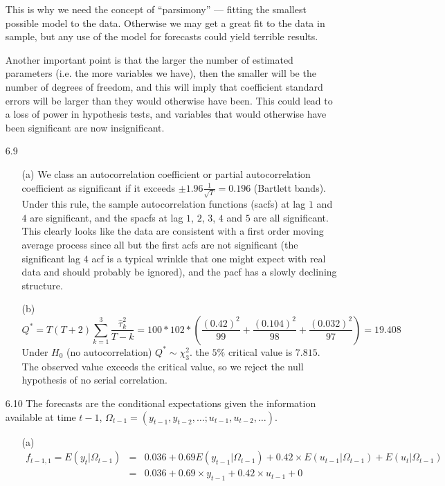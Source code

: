 \documentclass[11pt,a4paper]{article}
\begin{document}
\begin{itemize}
This is why we need
the concept of ``parsimony'' --- fitting the smallest possible model to the data.
Otherwise we may get a great fit to the data in sample, but any use of the
model for forecasts could yield terrible results.

Another important point is
that the larger the number of estimated parameters (i.e. the more variables we
have), then the smaller will be the number of degrees of freedom, and this will
imply that coefficient standard errors will be larger than they would otherwise
 have been. This could lead to a loss of power in hypothesis tests, and
variables that would otherwise have been significant are now insignificant.
\item[6.9]
\begin{itemize}
\item[(a)] We class an autocorrelation coefficient or partial autocorrelation
coefficient as  significant if it exceeds $\pm 1.96 \frac{1}{\sqrt{T}}=0.196$ (Bartlett bands). Under this rule, the sample autocorrelation functions (sacfs) at lag
 $1$ and $4$ are
significant, and the spacfs at lag $1$, $2$, $3$, $4$ and $5$ are all significant. This
clearly looks like the data are consistent with a first order moving average
process since all but the first acfs are not significant (the significant lag
$4$ acf is a typical wrinkle that one might expect with real data and should
probably be ignored), and the pacf has a slowly declining structure.
\item[(b)]
$$
 Q^* = T(T+2) \sum_{k=1}^3 \frac{\hat \tau^2_k}{T-k} = 100*102*\left(
\frac{(0.42)^2}{99}+\frac{(0.104)^2}{98}+\frac{(0.032)^2}{97}
\right) = 19.408
$$
Under $H_0$ (no autocorrelation) $Q^* \sim \chi^2_3$. the $5\%$ critical
value is $7.815$. The observed value exceeds the critical
value, so we reject the null hypothesis of no serial correlation.
\end{itemize}
\item[6.10]
The forecasts are the conditional expectations given the information
available at time $t-1$, $\Omega_{t-1} = (y_{t-1}, y_{t-2}, \ldots ; u_{t-1}, u_{t-2}, \ldots)$.
\begin{itemize}
\item[(a)]
$$
\begin{array}{rcl}
 f_{t-1,1} = E(y_t|\Omega_{t-1}) & = & 0.036 +0.69 E(y_{t-1}|\Omega_{t-1}) + 0.42\times E(u_{t-1}| \Omega_{t-1}) + E(u_t| \Omega_{t-1}) \\
 & = & 0.036 +0.69 \times y_{t-1} + 0.42\times u_{t-1} + 0 \\

\end{array}$$
\end{itemize}
\end{itemize}
\end{document}
